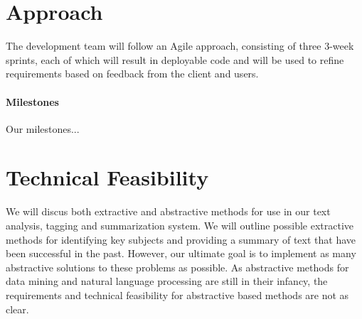 \documentclass[12pt]{article}
\begin{document}
%
%

\section{Approach}

The development team will follow an Agile approach, consisting of three 3-week sprints, each of which will result in deployable code and will be used to refine requirements based on feedback from the client and users.

\paragraph{Milestones}
Our milestones...

%
%

\section{Technical Feasibility }
We will discus both extractive and abstractive methods for use in our text analysis, tagging and summarization system. We will outline possible extractive methods for identifying key subjects and providing a summary of text that have been successful in the past. However, our ultimate goal is to implement as many abstractive solutions to these problems as possible. As abstractive methods for data mining and natural language processing are still in their infancy, the requirements and technical feasibility for abstractive based methods are not as clear.
\end{document}
